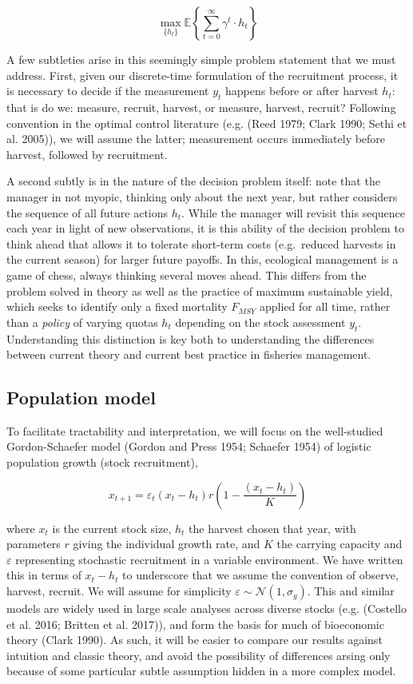 \documentclass[3p]{elsarticle} %
\begin{document}
\[\max_{ \lbrace h_t \rbrace } \mathbb{E} \left \{ \sum_{t=0}^{\infty} \gamma^t \cdot h_t \right \}\]

A few subtleties arise in this seemingly simple problem statement that
we must address. First, given our discrete-time formulation of the
recruitment process, it is necessary to decide if the measurement
\(y_t\) happens before or after harvest \(h_t\): that is do we: measure,
recruit, harvest, or measure, harvest, recruit? Following convention in
the optimal control literature (e.g. (Reed 1979; Clark 1990; Sethi et
al. 2005)), we will assume the latter; measurement occurs immediately
before harvest, followed by recruitment.

A second subtly is in the nature of the decision problem itself: note
that the manager in not myopic, thinking only about the next year, but
rather considers the sequence of all future actions \({h_t}\). While the
manager will revisit this sequence each year in light of new
observations, it is this ability of the decision problem to think ahead
that allows it to tolerate short-term costs (e.g.~reduced harvests in
the current season) for larger future payoffs. In this, ecological
management is a game of chess, always thinking several moves ahead. This
differs from the problem solved in theory as well as the practice of
maximum sustainable yield, which seeks to identify only a fixed
mortality \(F_{MSY}\) applied for all time, rather than a \emph{policy}
of varying quotas \(h_t\) depending on the stock assessment \(y_t\).
Understanding this distinction is key both to understanding the
differences between current theory and current best practice in
fisheries management.

\subsection{Population model}\label{population-model}

To facilitate tractability and interpretation, we will focus on the
well-studied Gordon-Schaefer model (Gordon and Press 1954; Schaefer
1954) of logistic population growth (stock recruitment),

\[x_{t+1} = \varepsilon_t (x_t-h_t) r  \left(1 - \frac{(x_t-h_t)}{K}\right) \]

where \(x_t\) is the current stock size, \(h_t\) the harvest chosen that
year, with parameters \(r\) giving the individual growth rate, and \(K\)
the carrying capacity and \(\varepsilon\) representing stochastic
recruitment in a variable environment. We have written this in terms of
\(x_t - h_t\) to underscore that we assume the convention of observe,
harvest, recruit. We will assume for simplicity
\(\varepsilon \sim \mathcal{N}(1, \sigma_g)\). This and similar models
are widely used in large scale analyses across diverse stocks (e.g.
(Costello et al. 2016; Britten et al. 2017)), and form the basis for
much of bioeconomic theory (Clark 1990). As such, it will be easier to
compare our results against intuition and classic theory, and avoid the
possibility of differences arsing only because of some particular subtle
assumption hidden in a more complex model.
\end{document}
